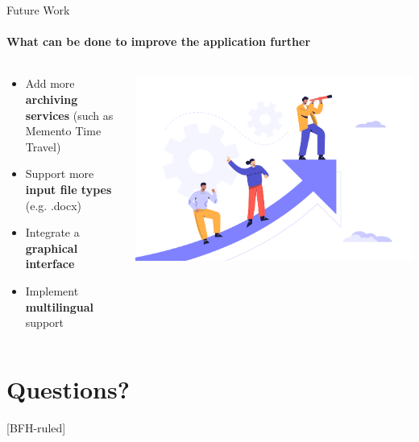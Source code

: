 \documentclass[
ngerman,%
authorontitle=true,
]{bfhbeamer}
\begin{document}
	\begin{frame}{Future Work}
		\framesubtitle{What can be done to improve the application further}
		\begin{columns} %
			\begin{column}{0.5\textwidth} %
				\begin{itemize}
					\item Add more \textbf{archiving services} (such as Memento Time Travel)
					\item Support more \textbf{input file types} (e.g. .docx)
					\item Integrate a \textbf{graphical interface}
					\item Implement \textbf{multilingual} support
				\end{itemize}
			\end{column}
			\begin{column}{0.3\textwidth} %
				\begin{center}
					\includegraphics[width=1\textwidth]{pictures/final_presentation/Business_team_2.jpg}
				\end{center}
			\end{column}
		\end{columns}
	\end{frame}
	
	\section{Questions?}
	[BFH-ruled]
	\frame{\sectionpage}
	
\end{document}
